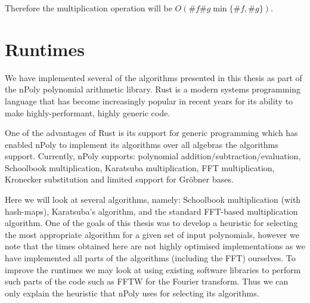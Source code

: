 Therefore the multiplication operation will be $O(\# f \# g \min\{\# f, \# g\})$.





\section{Runtimes}

We have implemented several of the algorithms presented in this thesis as part of the nPoly polynomial arithmetic library. Rust is a modern systems programming language that has become increasingly popular in recent years for its ability to make highly-performant, highly generic code.

One of the advantages of Rust is its support for generic programming which has enabled nPoly to implement its algorithms over all algebras the algorithms support. Currently, nPoly supports: polynomial addition/subtraction/evaluation, Schoolbook multiplication, Karatsuba multiplication, FFT multiplication, Kronecker substitution and limited support for Gr\"{o}bner bases.

Here we will look at several algorithms, namely: Schoolbook multiplication (with hash-maps), Karatsuba's algorithm, and the standard FFT-based multiplication algorithm. One of the goals of this thesis was to develop a heuristic for selecting the most appropriate algorithm for a given set of input polynomials, however we note that the times obtained here are not highly optimised implementations as we have implemented all parts of the algorithms (including the FFT) ourselves. To improve the runtimes we may look at using existing software libraries to perform such parts of the code such as FFTW for the Fourier transform. Thus we can only explain the heuristic that nPoly uses for selecting its algorithms.

